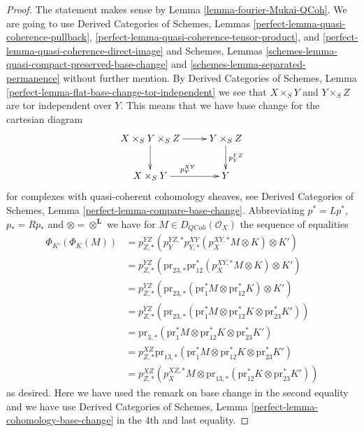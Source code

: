\documentclass{stacks-project}
\theoremstyle{plain}
\theoremstyle{definition}
\theoremstyle{remark}
\numberwithin{equation}{subsection}
\def\QCoh{\mathit{QCoh}}
\begin{document}
\begin{proof}
The statement makes sense by Lemma \ref{lemma-fourier-Mukai-QCoh}.
We are going to use
Derived Categories of Schemes, Lemmas
\ref{perfect-lemma-quasi-coherence-pullback},
\ref{perfect-lemma-quasi-coherence-tensor-product}, and
\ref{perfect-lemma-quasi-coherence-direct-image}
and Schemes, Lemmas
\ref{schemes-lemma-quasi-compact-preserved-base-change} and
\ref{schemes-lemma-separated-permanence}
without further mention.
By Derived Categories of Schemes, Lemma
\ref{perfect-lemma-flat-base-change-tor-independent}
we see that $X \times_S Y$ and $Y \times_S Z$ are tor independent
over $Y$. This means that we have base change for the cartesian diagram
$$
\xymatrix{
X \times_S Y \times_S Z \ar[d] \ar[r] &
Y \times_S Z \ar[d]^{p^{YZ}_Y} \\
X \times_S Y \ar[r]^{p^{XY}_Y} & Y
}
$$
for complexes with quasi-coherent cohomology sheaves, see
Derived Categories of Schemes, Lemma \ref{perfect-lemma-compare-base-change}.
Abbreviating $p^* = Lp^*$, $p_* = Rp_*$ and $\otimes = \otimes^\mathbf{L}$
we have for $M \in D_\QCoh(\mathcal{O}_X)$ the sequence of equalities
\begin{align*}
\Phi_{K'}(\Phi_K(M))
& =
p^{YZ}_{Z, *}(p^{YZ, *}_Y p^{XY}_{Y, *}(p^{XY, *}_X M \otimes K) \otimes K') \\
& =
p^{YZ}_{Z, *}(\text{pr}_{23, *} \text{pr}_{12}^*(p^{XY, *}_X M \otimes K)
\otimes K') \\
& =
p^{YZ}_{Z, *}(\text{pr}_{23, *}(\text{pr}_1^*M \otimes \text{pr}_{12}^*K)
\otimes K') \\
& =
p^{YZ}_{Z, *}(\text{pr}_{23, *}(\text{pr}_1^*M \otimes \text{pr}_{12}^*K
\otimes \text{pr}_{23}^*K')) \\
& =
\text{pr}_{3, *}(\text{pr}_1^*M \otimes \text{pr}_{12}^*K
\otimes \text{pr}_{23}^*K') \\
& =
p^{XZ}_{Z, *}\text{pr}_{13, *}(\text{pr}_1^*M \otimes \text{pr}_{12}^*K
\otimes \text{pr}_{23}^*K') \\
& =
p^{XZ}_{Z, *} (p^{XZ, *}_X M \otimes \text{pr}_{13, *}(\text{pr}_{12}^*K
\otimes \text{pr}_{23}^*K'))
\end{align*}
as desired. Here we have used the remark on base change in the
second equality and we have use Derived Categories of Schemes, Lemma
\ref{perfect-lemma-cohomology-base-change} in the $4$th and
last equality.
\end{proof}
\end{document}
